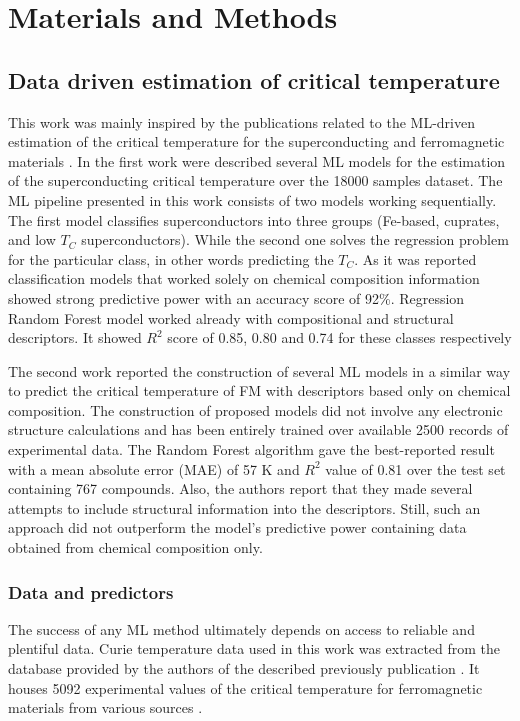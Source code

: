 \chapter{Materials and Methods}

\section{Data driven estimation of critical temperature}
\label{section:ML_models}
This work was mainly inspired by the publications related to the ML-driven estimation of the critical temperature for the superconducting  \cite{Stanev:2018uk} and ferromagnetic materials \cite{Nelson:2019ui}.
In the first work \cite{Stanev:2018uk} were described several ML models for the estimation of the superconducting critical temperature over the 18000 samples dataset. The ML pipeline presented in this work consists of two models working sequentially. The first model classifies superconductors into three groups (Fe-based, cuprates, and low $T_C$ superconductors). While the second one solves the regression problem for the particular class, in other words predicting the $T_C$.  As it was reported classification models that worked solely on chemical composition information showed strong predictive power with an accuracy score of 92\%. Regression Random Forest model worked already with compositional and structural descriptors. It showed $R^2$ score of 0.85, 0.80 and 0.74 for these classes respectively

The second work \cite{Nelson:2019ui} reported the construction of several ML models in a similar way to predict the critical temperature of FM with descriptors based only on chemical composition.  The construction of proposed models did not involve any electronic structure calculations and has been entirely trained over available 2500 records of experimental data. The Random Forest algorithm gave the best-reported result with a mean absolute error (MAE) of 57 K and $R^2$ value of 0.81 over the test set containing 767 compounds. 
Also, the authors report that they made several attempts to include structural information into the descriptors. Still, such an approach did not outperform the model's predictive power containing data obtained from chemical composition only.

\subsection{Data and predictors}
The success of any ML method ultimately depends on access to reliable and plentiful data. Curie temperature data used in this work was extracted from the database provided by the authors of the described previously publication \cite{Nelson:2019ui}.  It houses 5092 experimental values of the critical temperature for ferromagnetic materials from various sources \cite{Xu2011InorganicMD,  osti_4549319}.

